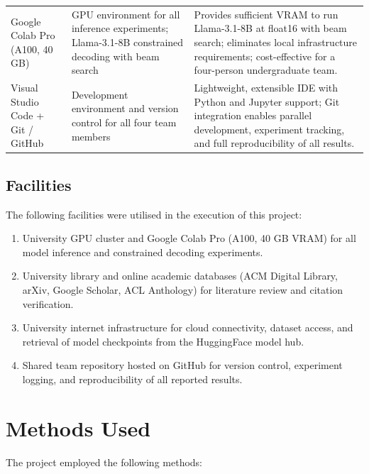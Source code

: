 \begin{table}[t]
\begin{tabular}{p{}p{}p{}}
		Google Colab Pro (A100, 40 GB)           & GPU environment for all inference experiments; Llama-3.1-8B constrained decoding with beam search                 & Provides sufficient VRAM to run Llama-3.1-8B at float16 with beam search; eliminates local infrastructure requirements; cost-effective for a four-person undergraduate team.                                            \\
		Visual Studio Code + Git / GitHub        & Development environment and version control for all four team members                                             & Lightweight, extensible IDE with Python and Jupyter support; Git integration enables parallel development, experiment tracking, and full reproducibility of all results.                                                \\
		\bottomrule
	\end{tabular}
\end{table}

\subsection{Facilities}

The following facilities were utilised in the execution of this project:

\begin{enumerate}[label=\roman*.]
	\item University GPU cluster and Google Colab Pro (A100, 40 GB VRAM) for all model inference and constrained decoding experiments.
	\item University library and online academic databases (ACM Digital Library, arXiv, Google Scholar, ACL Anthology) for literature review and citation verification.
	\item University internet infrastructure for cloud connectivity, dataset access, and retrieval of model checkpoints from the HuggingFace model hub.
	\item Shared team repository hosted on GitHub for version control, experiment logging, and reproducibility of all reported results.
\end{enumerate}

\section{Methods Used}

The project employed the following methods:

